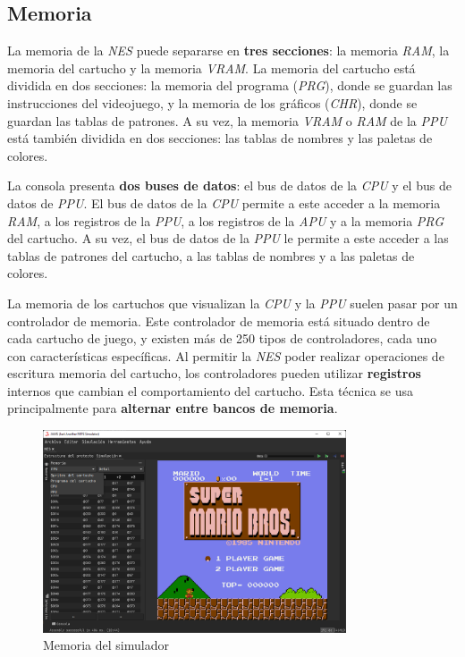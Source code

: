 \subsection{Memoria}\label{subsec:memoria}

La memoria de la \textit{NES} puede separarse en \textbf{tres secciones}:
la memoria \textit{RAM}, la memoria del cartucho y la memoria \textit{VRAM}.
La memoria del cartucho está dividida en dos secciones:
la memoria del programa (\textit{PRG}), donde se guardan
las instrucciones del videojuego,
y la memoria de los gráficos (\textit{CHR}), donde se guardan
las tablas de patrones.
A su vez, la memoria \textit{VRAM} o \textit{RAM} de la \textit{PPU}
está también dividida en dos secciones:
las tablas de nombres y las paletas de colores.

La consola presenta \textbf{dos buses de datos}:
el bus de datos de la \textit{CPU}
y el bus de datos de \textit{PPU}.
El bus de datos de la \textit{CPU} permite a
este acceder a la memoria \textit{RAM},
a los registros de la \textit{PPU},
a los registros de la \textit{APU}
y a la memoria \textit{PRG} del cartucho.
A su vez, el bus de datos de la \textit{PPU}
le permite a este acceder a las tablas de patrones
del cartucho, a las tablas de nombres y a las paletas
de colores.

La memoria de los cartuchos que visualizan la \textit{CPU}
y la \textit{PPU} suelen pasar por un controlador de memoria.
Este controlador de memoria está situado dentro de cada cartucho
de juego, y existen más de 250 tipos de controladores, cada
uno con características específicas.
Al permitir la \textit{NES} poder realizar operaciones de
escritura  memoria del cartucho, los controladores
pueden utilizar \textbf{registros} internos que cambian
el comportamiento del cartucho.
Esta técnica se usa principalmente para \textbf{alternar
entre bancos de memoria}.

\begin{figure}[h]
    \centering
    \includegraphics[width=0.8\textwidth]{images/nes/nes-memory}
    \caption{Memoria del simulador}
    \label{fig:nes-memory}
\end{figure}

